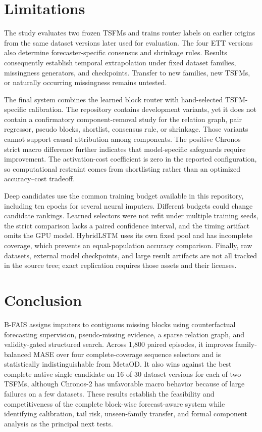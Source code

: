 \documentclass{article}
\newcommand{\bfais}{\textsc{B-FAIS}\xspace}
\begin{document}
\section{Limitations}
\label{sec:limitations}

The study evaluates two frozen TSFMs and trains router labels on earlier origins from the same dataset versions later used for evaluation. The four ETT versions also determine forecaster-specific consensus and shrinkage rules. Results consequently establish temporal extrapolation under fixed dataset families, missingness generators, and checkpoints. Transfer to new families, new TSFMs, or naturally occurring missingness remains untested.

The final system combines the learned block router with hand-selected TSFM-specific calibration. The repository contains development variants, yet it does not contain a confirmatory component-removal study for the relation graph, pair regressor, pseudo blocks, shortlist, consensus rule, or shrinkage. Those variants cannot support causal attribution among components. The positive Chronos strict macro difference further indicates that model-specific safeguards require improvement. The activation-cost coefficient is zero in the reported configuration, so computational restraint comes from shortlisting rather than an optimized accuracy--cost tradeoff.

Deep candidates use the common training budget available in this repository, including ten epochs for several neural imputers. Different budgets could change candidate rankings. Learned selectors were not refit under multiple training seeds, the strict comparison lacks a paired confidence interval, and the timing artifact omits the GPU model. HybridLSTM uses its own fixed pool and has incomplete coverage, which prevents an equal-population accuracy comparison. Finally, raw datasets, external model checkpoints, and large result artifacts are not all tracked in the source tree; exact replication requires those assets and their licenses.

\section{Conclusion}
\label{sec:conclusion}

\bfais assigns imputers to contiguous missing blocks using counterfactual forecasting supervision, pseudo-missing evidence, a sparse relation graph, and validity-gated structured search. Across 1,800 paired episodes, it improves family-balanced MASE over four complete-coverage sequence selectors and is statistically indistinguishable from MetaOD. It also wins against the best complete native single candidate on 16 of 30 dataset versions for each of two TSFMs, although Chronos-2 has unfavorable macro behavior because of large failures on a few datasets. These results establish the feasibility and competitiveness of the complete block-wise forecast-aware system while identifying calibration, tail risk, unseen-family transfer, and formal component analysis as the principal next tests.




\appendix

\end{document}
